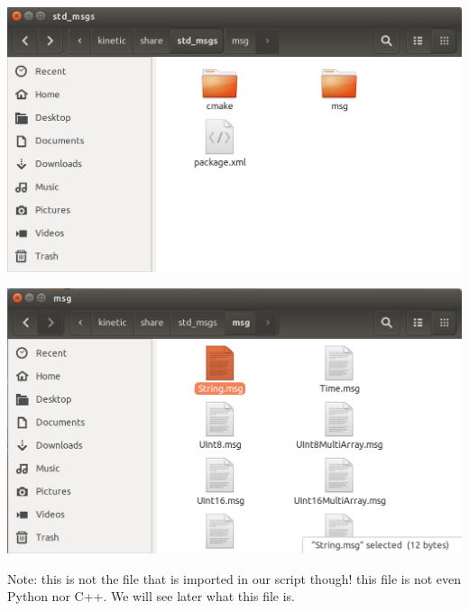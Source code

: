 \documentclass{beamer}
\begin{document}
\begin{frame}[plain]{}
\includegraphics[width=1.0\linewidth]{figures/std_msgs.png}
\end{frame}

\begin{frame}[plain]{}
    \includegraphics[width=1.0\linewidth]{figures/string.png}
    
    {\scriptsize Note: this is not the file that is imported in our script though! this file is not even Python nor C++. We will see later what this file is.}
\end{frame}
\end{document}
